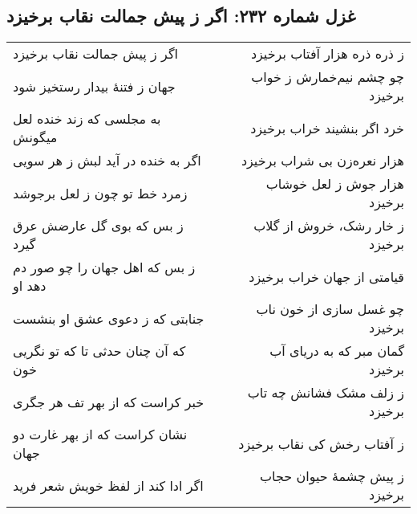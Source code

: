 \begin{center}
\section*{غزل شماره ۲۳۲: اگر ز پیش جمالت نقاب برخیزد}
\label{sec:232}
\begin{longtable}{l p{0.5cm} r}
اگر ز پیش جمالت نقاب برخیزد
&&
ز ذره ذره هزار آفتاب برخیزد
\\
جهان ز فتنهٔ بیدار رستخیز شود
&&
چو چشم نیم‌خمارش ز خواب برخیزد
\\
به مجلسی که زند خنده لعل میگونش
&&
خرد اگر بنشیند خراب برخیزد
\\
اگر به خنده در آید لبش ز هر سویی
&&
هزار نعره‌زن بی شراب برخیزد
\\
زمرد خط تو چون ز لعل برجوشد
&&
هزار جوش ز لعل خوشاب برخیزد
\\
ز بس که بوی گل عارضش عرق گیرد
&&
ز خار رشک، خروش از گلاب برخیزد
\\
ز بس که اهل جهان را چو صور دم دهد او
&&
قیامتی از جهان خراب برخیزد
\\
جنابتی که ز دعوی عشق او بنشست
&&
چو غسل سازی از خون ناب برخیزد
\\
که آن چنان حدثی تا که تو نگریی خون
&&
گمان مبر که به دریای آب برخیزد
\\
خبر کراست که از بهر تف هر جگری
&&
ز زلف مشک فشانش چه تاب برخیزد
\\
نشان کراست که از بهر غارت دو جهان
&&
ز آفتاب رخش کی نقاب برخیزد
\\
اگر ادا کند از لفظ خویش شعر فرید
&&
ز پیش چشمهٔ حیوان حجاب برخیزد
\\
\end{longtable}
\end{center}
